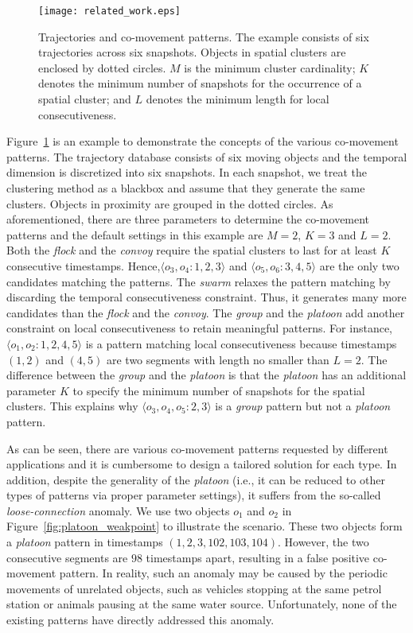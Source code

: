 \begin{figure}[h]
\centering
\texttt{[image: related\_work.eps]}
\caption{Trajectories and co-movement patterns. The example consists of six trajectories across six snapshots. Objects in spatial clusters are enclosed by dotted circles. $M$ is the minimum cluster cardinality; $K$ denotes the minimum number of snapshots for the occurrence of a spatial cluster; and $L$ denotes the minimum length for local consecutiveness.}
\label{fig:related_work}
\end{figure}

Figure~\ref{fig:related_work} is an example to demonstrate the concepts of the various co-movement patterns. The trajectory database consists of six moving objects and the temporal dimension is discretized into six snapshots. In each snapshot, we treat the clustering method as a blackbox and assume that they generate the same clusters. Objects in proximity are grouped in the dotted circles. As aforementioned, there are three parameters to determine the co-movement patterns and the default settings in this example are $M=2$, $K=3$ and $L=2$. Both the \emph{flock} and the \emph{convoy} require the spatial clusters to last for at least $K$ consecutive  timestamps. Hence,$\langle o_3,o_4:1,2,3 \rangle$ and $\langle o_5,o_6:3,4,5 \rangle$  are the only two candidates matching the patterns. The \textit{swarm} relaxes the pattern matching by discarding the temporal consecutiveness constraint. Thus, it generates many more candidates than the \textit{flock} and the \textit{convoy}. The \textit{group} and the \textit{platoon} add another constraint on local consecutiveness to retain meaningful patterns. For instance, $\langle o_1,o_2:1,2,4,5 \rangle$ is a pattern matching local consecutiveness because timestamps $(1,2)$ and $(4,5)$ are two segments with length no smaller than $L=2$. The difference between the \textit{group} and the \textit{platoon} is that the \textit{platoon} has an additional parameter $K$ to specify the minimum number of snapshots for the spatial clusters. This explains why $\langle o_3,o_4,o_5:2,3 \rangle$ is a  \textit{group} pattern but not a \textit{platoon} pattern.

As can be seen, there are various co-movement patterns requested by different applications and it is cumbersome to design a tailored solution for each type. In addition, despite the generality of the \emph{platoon} (i.e., it can be reduced to other types of patterns via proper parameter settings), it suffers from the so-called \emph{loose-connection} anomaly. We use two objects $o_1$ and $o_2$ in Figure~\ref{fig:platoon_weakpoint} to illustrate the scenario. These two objects form a \emph{platoon} pattern in timestamps $(1,2,3,102,103,104)$. However, the two consecutive segments are $98$ timestamps apart, resulting in a false positive co-movement pattern. In reality, such an anomaly may be caused  by the periodic movements of unrelated objects, such as vehicles stopping at the same petrol station or animals pausing at the same water source. 
Unfortunately, none of the existing patterns have directly addressed this anomaly.

